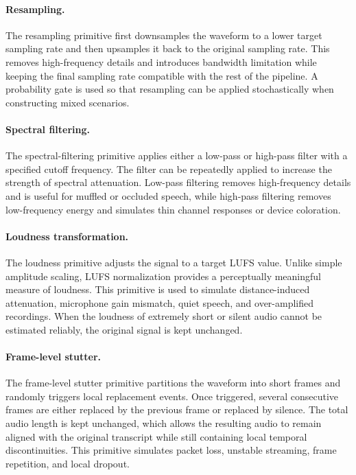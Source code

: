 \documentclass{article}
\begin{document}
\paragraph{Resampling.}
The resampling primitive first downsamples the waveform to a lower target
sampling rate and then upsamples it back to the original sampling rate. This
removes high-frequency details and introduces bandwidth limitation while keeping
the final sampling rate compatible with the rest of the pipeline. A probability
gate is used so that resampling can be applied stochastically when constructing
mixed scenarios.

\paragraph{Spectral filtering.}
The spectral-filtering primitive applies either a low-pass or high-pass filter
with a specified cutoff frequency. The filter can be repeatedly applied to
increase the strength of spectral attenuation. Low-pass filtering removes
high-frequency details and is useful for muffled or occluded speech, while
high-pass filtering removes low-frequency energy and simulates thin channel
responses or device coloration.

\paragraph{Loudness transformation.}
The loudness primitive adjusts the signal to a target LUFS value. Unlike simple
amplitude scaling, LUFS normalization provides a perceptually meaningful measure
of loudness. This primitive is used to simulate distance-induced attenuation,
microphone gain mismatch, quiet speech, and over-amplified recordings. When the
loudness of extremely short or silent audio cannot be estimated reliably, the
original signal is kept unchanged.

\paragraph{Frame-level stutter.}
The frame-level stutter primitive partitions the waveform into short frames and
randomly triggers local replacement events. Once triggered, several consecutive
frames are either replaced by the previous frame or replaced by silence. The
total audio length is kept unchanged, which allows the resulting audio to remain
aligned with the original transcript while still containing local temporal
discontinuities. This primitive simulates packet loss, unstable streaming,
frame repetition, and local dropout.
\end{document}

